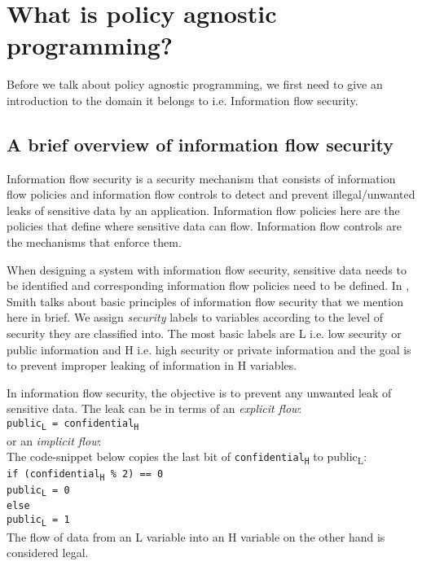 \chapter{What is policy agnostic programming?\label{chap:PAP}}

Before we talk about policy agnostic programming, we first need to give an
introduction to the domain it belongs to i.e. Information flow security.

\section{A brief overview of information flow security}

Information flow security is a security mechanism that consists of information flow
policies and information flow controls to detect and prevent illegal/unwanted leaks
of sensitive data by an application. Information flow policies here are the policies
that define where sensitive data can flow. Information flow controls are the mechanisms
that enforce them.

When designing a system with information flow security, sensitive data needs to
be identified and corresponding information flow policies need to be defined. In
\cite{PrincInfoSec}, Smith talks about basic principles of information flow security
that we mention here in brief. We assign \textit{security} labels to variables
according to the level of security they are classified into. The most basic labels
are L i.e. low security or public information and H i.e. high security or private
information and the goal is to prevent improper leaking of information in H variables.

In information flow security, the
objective is to prevent any unwanted leak of sensitive data. The leak can be in
terms of an \textit{explicit flow}: \\ \indent
\texttt{public\textsubscript{L} = confidential\textsubscript{H}} \\
\noindent or an \textit{implicit flow}: \\ The code-snippet below
copies the last bit of \texttt{confidential\textsubscript{H}} to public\textsubscript{L}: \\
\indent
	\texttt{if (confidential\textsubscript{H} \% 2)  == 0 \\ \indent \indent
		public\textsubscript{L} = 0 \\ \indent
	else \\ \indent \indent
		public\textsubscript{L} = 1} \\
The flow of data from an L variable into an H variable on the other hand is considered
legal.

